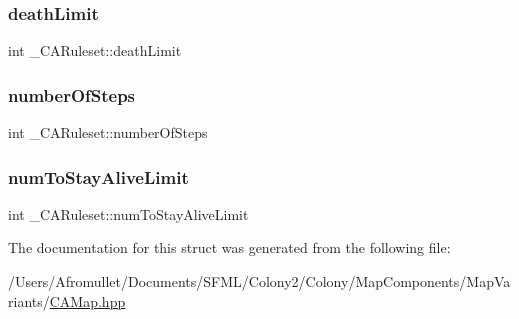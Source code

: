 \subsubsection{\texorpdfstring{death\+Limit}{deathLimit}}
{\footnotesize\ttfamily int \+\_\+\+C\+A\+Ruleset\+::death\+Limit}

\mbox{\label{struct___c_a_ruleset_ac2f4cb85d2b3e775e33eaed281a92b2d}} 
\subsubsection{\texorpdfstring{number\+Of\+Steps}{numberOfSteps}}
{\footnotesize\ttfamily int \+\_\+\+C\+A\+Ruleset\+::number\+Of\+Steps}

\mbox{\label{struct___c_a_ruleset_a8af594e5e229ec31c0ef86b9bf214401}} 
\subsubsection{\texorpdfstring{num\+To\+Stay\+Alive\+Limit}{numToStayAliveLimit}}
{\footnotesize\ttfamily int \+\_\+\+C\+A\+Ruleset\+::num\+To\+Stay\+Alive\+Limit}



The documentation for this struct was generated from the following file\+:\begin{DoxyCompactItemize}
\item 
/\+Users/\+Afromullet/\+Documents/\+S\+F\+M\+L/\+Colony2/\+Colony/\+Map\+Components/\+Map\+Variants/\mbox{\hyperlink{_c_a_map_8hpp}{C\+A\+Map.\+hpp}}\end{DoxyCompactItemize}
